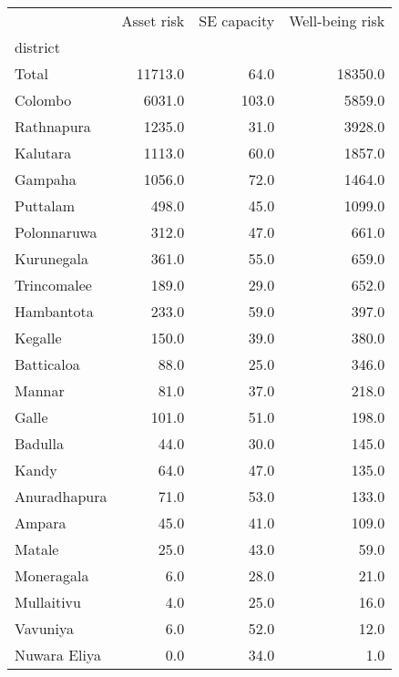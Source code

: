 \begin{tabular}{lrrr}
\toprule
{} &  Asset risk &  SE capacity &  Well-being risk \\
district     &             &              &                  \\
\midrule
Total        &     11713.0 &         64.0 &          18350.0 \\
Colombo      &      6031.0 &        103.0 &           5859.0 \\
Rathnapura   &      1235.0 &         31.0 &           3928.0 \\
Kalutara     &      1113.0 &         60.0 &           1857.0 \\
Gampaha      &      1056.0 &         72.0 &           1464.0 \\
Puttalam     &       498.0 &         45.0 &           1099.0 \\
Polonnaruwa  &       312.0 &         47.0 &            661.0 \\
Kurunegala   &       361.0 &         55.0 &            659.0 \\
Trincomalee  &       189.0 &         29.0 &            652.0 \\
Hambantota   &       233.0 &         59.0 &            397.0 \\
Kegalle      &       150.0 &         39.0 &            380.0 \\
Batticaloa   &        88.0 &         25.0 &            346.0 \\
Mannar       &        81.0 &         37.0 &            218.0 \\
Galle        &       101.0 &         51.0 &            198.0 \\
Badulla      &        44.0 &         30.0 &            145.0 \\
Kandy        &        64.0 &         47.0 &            135.0 \\
Anuradhapura &        71.0 &         53.0 &            133.0 \\
Ampara       &        45.0 &         41.0 &            109.0 \\
Matale       &        25.0 &         43.0 &             59.0 \\
Moneragala   &         6.0 &         28.0 &             21.0 \\
Mullaitivu   &         4.0 &         25.0 &             16.0 \\
Vavuniya     &         6.0 &         52.0 &             12.0 \\
Nuwara Eliya &         0.0 &         34.0 &              1.0 \\
\bottomrule
\end{tabular}

